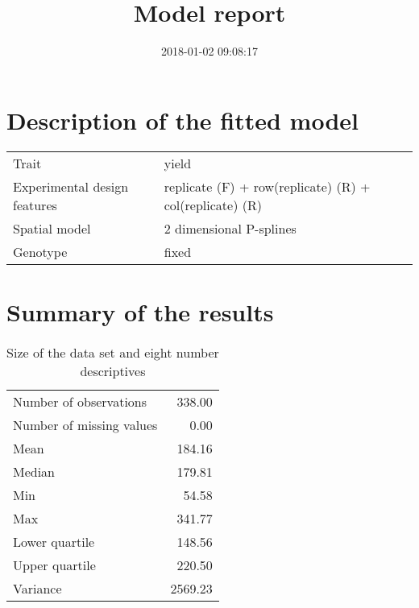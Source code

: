 \documentclass[a4paper,11pt]{article}\usepackage[]{graphicx}\usepackage[]{color}
\title{Model report}%
\author{\vspace{-5ex}}
\date{2018-01-02 09:08:17}
\begin{document}



\maketitle

\singlespacing

\section{Description of the fitted model}

\begin{table}[ht]
\begin{flushleft}
\begin{tabular}{ll}
  Trait & yield \\ 
  Experimental design features & replicate (F) + row(replicate) (R) + col(replicate) (R) \\ 
  Spatial model & 2 dimensional P-splines \\ 
  Genotype & fixed \\ 
  \end{tabular}
\label{modelDescription}
\end{flushleft}
\end{table}


\section{Summary of the results}

\begin{table}[ht]
\begin{flushleft}
\caption{Size of the data set and eight number descriptives} 
\label{modelSummary}
\begin{tabular}{lr}
  \hline
  \hline
Number of observations & 338.00 \\ 
  Number of missing values & 0.00 \\ 
  Mean & 184.16 \\ 
  Median & 179.81 \\ 
  Min & 54.58 \\ 
  Max & 341.77 \\ 
  Lower quartile & 148.56 \\ 
  Upper quartile & 220.50 \\ 
  Variance & 2569.23 \\ 
   \hline
\end{tabular}
\end{flushleft}
\end{table}
\end{document}
